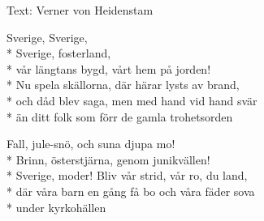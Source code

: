 \begin{SongText}[Sverige]
    \begin{SongInfo}
        Text: Verner von Heidenstam
    \end{SongInfo}
    \begin{SongVerse}
        Sverige, Sverige,\\*%
        Sverige, fosterland,\\*%
        vår längtans bygd, vårt hem på jorden!\\*%
        Nu spela skällorna, där härar lysts av brand,\\*%
        och dåd blev saga, men med hand vid hand svär\\*%
        än ditt folk som förr de gamla trohetsorden
    \end{SongVerse}
    \begin{SongVerse}
        Fall, jule-snö, och suna djupa mo!\\*%
        Brinn, österstjärna, genom junikvällen!\\*%
        Sverige, moder! Bliv vår strid, vår ro, du land,\\*%
        där våra barn en gång få bo och våra fäder sova\\*%
        under kyrkohällen
    \end{SongVerse}
\end{SongText}